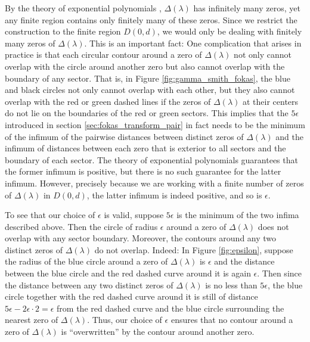 \documentclass[12pt, oneside, a4paper]{article}
\begin{document}
By the theory of exponential polynomials \cite{Langer1931}, $\Delta(\lambda)$ has infinitely many zeros, yet any finite region contains only finitely many of these zeros. Since we restrict the construction to the finite region $D(0, d)$, we would only be dealing with finitely many zeros of $\Delta(\lambda)$. This is an important fact: One complication that arises in practice is that each circular contour around a zero of $\Delta(\lambda)$ not only cannot overlap with the circle around another zero but also cannot overlap with the boundary of any sector. That is, in Figure \ref{fig:gamma_smith_fokas}, the blue and black circles not only cannot overlap with each other, but they also cannot overlap with the red or green dashed lines if the zeros of $\Delta(\lambda)$ at their centers do not lie on the boundaries of the red or green sectors. This implies that the $5\epsilon$ introduced in section \ref{sec:fokas_transform_pair} in fact needs to be the minimum of the infimum of the pairwise distances between distinct zeros of $\Delta(\lambda)$ and the infimum of distances between each zero that is exterior to all sectors and the boundary of each sector. The theory of exponential polynomials \cite{Langer1931} guarantees that the former infimum is positive, but there is no such guarantee for the latter infimum. However, precisely because we are working with a finite number of zeros of $\Delta(\lambda)$ in $D(0, d)$, the latter infimum is indeed positive, and so is $\epsilon$. 

To see that our choice of $\epsilon$ is valid, suppose $5\epsilon$ is the minimum of the two infima described above. Then the circle of radius $\epsilon$ around a zero of $\Delta(\lambda)$ does not overlap with any sector boundary. Moreover, the contours around any two distinct zeros of $\Delta(\lambda)$ do not overlap. Indeed: In Figure \ref{fig:epsilon}, suppose the radius of the blue circle around a zero of $\Delta(\lambda)$ is $\epsilon$ and the distance between the blue circle and the red dashed curve around it is again $\epsilon$. Then since the distance between any two distinct zeros of $\Delta(\lambda)$ is no less than $5\epsilon$, the blue circle together with the red dashed curve around it is still of distance $5\epsilon-2\epsilon\cdot 2 = \epsilon$ from the red dashed curve and the blue circle surrounding the nearest zero of $\Delta(\lambda)$. Thus, our choice of $\epsilon$ ensures that no contour around a zero of $\Delta(\lambda)$ is ``overwritten'' by the contour around another zero.
\end{document}
